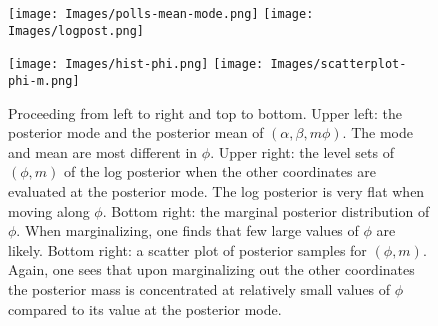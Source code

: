 \documentclass[11pt]{article}
\begin{document}
\begin{figure}
\label{fig:phi-mm}
\centering
\texttt{[image: Images/polls-mean-mode.png]}
\texttt{[image: Images/logpost.png]}

\texttt{[image: Images/hist-phi.png]}
\texttt{[image: Images/scatterplot-phi-m.png]}

\caption{Proceeding from left to right and top to bottom.  Upper left: the
  posterior mode and the posterior mean of $(\alpha, \beta, m \phi)$.  The mode
  and mean are most different in $\phi$.  Upper right: the level sets of $(\phi,
  m)$ of the log posterior when the other coordinates are evaluated at the
  posterior mode.  The log posterior is very flat when moving along $\phi$.
  Bottom right: the marginal posterior distribution of $\phi$.  When
  marginalizing, one finds that few large values of $\phi$ are likely.  Bottom
  right: a scatter plot of posterior samples for $(\phi, m)$. Again, one sees
  that upon marginalizing out the other coordinates the posterior mass is
  concentrated at relatively small values of $\phi$ compared to its value at the
  posterior mode.}
\end{figure}


{}
\end{document}
